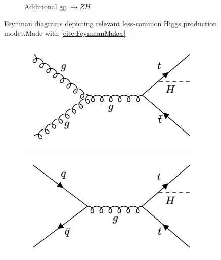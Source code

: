 \begin{figure}[htp]
\begin{subfigure}[b]{0.3\textwidth}
         \caption{Additional gg $\rightarrow ZH$ }
         \label{fig:ggZH}
     \end{subfigure}
     \hfill
  \label{fig:loopmodes}
  \caption{Feynman diagrams depicting relevant less-common Higgs production modes.Made with \ref{cite:FeynmanMaker}}  
\end{figure}

\begin{figure}[htp]
  \centering
       \begin{subfigure}[b]{0.3\textwidth}
         \centering
         \includegraphics[width=\textwidth]{figures/theory_chapter/ttH1.png}
         \label{fig:ttH1}
     \end{subfigure}
     \hfill
       \begin{subfigure}[b]{0.3\textwidth}
         \centering
         \includegraphics[width=\textwidth]{figures/theory_chapter/ttH2.png}
         \label{fig:ttH2}
     \end{subfigure}
     \hfill
       \begin{subfigure}[b]{0.3\textwidth}
         \centering

\end{subfigure}
\end{figure}

